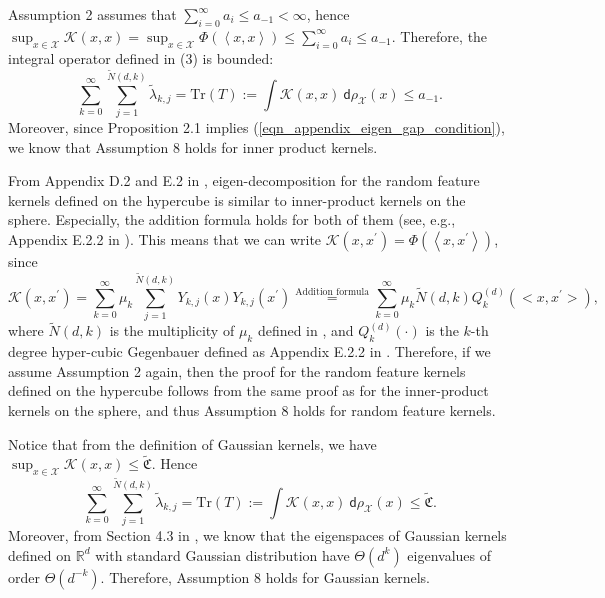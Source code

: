 \documentclass{article}
\theoremstyle{plain}
\theoremstyle{definition}
\theoremstyle{remark}
\newcommand{\calX}{\mathcal{X}}
\begin{document}
\begin{appendix}
Assumption 2 assumes that $\sum\nolimits_{i=0}^{\infty} a_i \leq a_{-1} < \infty$, hence $\sup_{x \in \mathcal X} \mathscr{K}(x, x) 
    = \sup_{x \in \mathcal X} \Phi(\left\langle x, x \right\rangle) 
    \leq \sum\nolimits_{i=0}^{\infty} a_i \leq a_{-1}$. Therefore, the integral operator defined in (3) is bounded:
    $$
        \sum_{k=0}^{\infty} \sum_{j=1}^{\tilde{N}(d, k)} \tilde{\lambda}_{k, j}  = \text{Tr}(T) :=\int \mathscr{K}(x, x)  ~\mathsf{d} \rho_{\calX}(x) \leq a_{-1}.
    $$
    Moreover, since Proposition 2.1 implies (\ref{eqn_appendix_eigen_gap_condition}), we know that Assumption 8 holds for inner product kernels.


    
    

From Appendix D.2 and E.2 in \cite{mei2022generalization}, eigen-decomposition for the random feature kernels defined on the hypercube is similar to inner-product kernels on the sphere. Especially, the addition formula holds for both of them (see, e.g., Appendix E.2.2 in \cite{mei2022generalization}).
    This means that we can write $\mathscr{K}(x, x^\prime) = \Phi(\left\langle x, x^\prime \right\rangle)$, since
    $$
        \mathscr{K}(x, x^\prime) = \sum_{k=0}^{\infty} \mu_{k} \sum_{j=1}^{\tilde{N}(d, k)}  Y_{k,j}(x) Y_{k,j}(x^\prime) \overset{\text{Addition formula}}{=} \sum_{k=0}^{\infty} \mu_{k} \tilde{N}(d, k) Q_k^{(d)}(<x, x^\prime>),
    $$
    where $\tilde{N}(d, k)$ is the multiplicity of $\mu_{k}$ defined in \cite{mei2022generalization}, and $Q_k^{(d)}(\cdot)$ is the $k$-th degree  hyper-cubic Gegenbauer defined as Appendix E.2.2 in \cite{mei2022generalization}. Therefore, if we assume Assumption 2 again,
    then the proof for the random feature kernels defined on the hypercube follows from the same proof as for the inner-product kernels on the sphere, and thus Assumption 8 holds for random feature kernels.



Notice that from the definition of Gaussian kernels, we have $\sup_{x \in \mathcal X} \mathscr{K}(x, x) \leq \tilde{\mathfrak{C}}$. Hence
    $$
        \sum_{k=0}^{\infty} \sum_{j=1}^{\tilde{N}(d, k)} \tilde{\lambda}_{k, j}  = \text{Tr}(T) :=\int \mathscr{K}(x, x)  ~\mathsf{d} \rho_{\calX}(x) \leq \tilde{\mathfrak{C}}.
    $$
    Moreover, from Section 4.3 in \cite{rasmussen2003gaussian}, we know that the eigenspaces of Gaussian kernels defined on $\mathbb{R}^d$ with standard Gaussian distribution have $\Theta(d^k)$ eigenvalues of order $\Theta(d^{-k})$.
    Therefore, Assumption 8 holds for Gaussian kernels.


\end{appendix}
\end{document}
